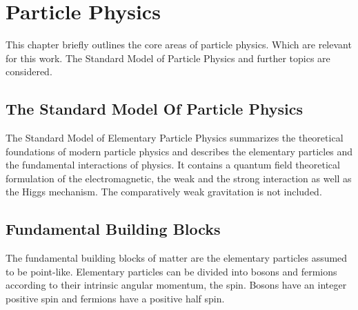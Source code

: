 \documentclass[12pt, a4paper]{thesis}
\begin{document}
\chapter{Particle Physics}
\label{sec:orgcd2d7c7}
This chapter briefly outlines the core areas of particle
physics. Which are relevant for this work. The Standard Model of
Particle Physics and further topics are considered.

\section{The Standard Model Of Particle Physics}
\label{sec:org862e92f}
The Standard Model of Elementary Particle Physics summarizes the
theoretical foundations of modern particle physics and describes the
elementary particles and the fundamental interactions of physics. It
contains a quantum field theoretical formulation of the
electromagnetic, the weak and the strong interaction as well as the
Higgs mechanism. The comparatively weak gravitation is not included.

\section{Fundamental Building Blocks}
\label{sec:org4008fdf}
The fundamental building blocks of matter are the elementary particles assumed
to be point-like. Elementary particles can be divided into bosons and fermions
according to their intrinsic angular momentum, the spin. Bosons have
an integer positive spin and fermions have a positive half spin.
\end{document}
